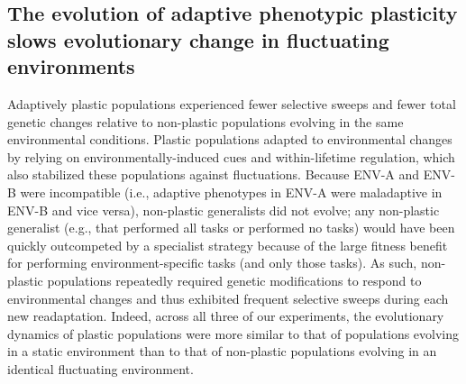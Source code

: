 \subsection{The evolution of adaptive phenotypic plasticity slows evolutionary change in fluctuating environments}

Adaptively plastic populations experienced fewer selective sweeps and fewer total genetic changes relative to non-plastic populations evolving in the same environmental conditions.
Plastic populations adapted to environmental changes by relying on environmentally-induced cues and within-lifetime regulation, which also stabilized these populations against fluctuations. 
Because ENV-A and ENV-B were incompatible (i.e., adaptive phenotypes in ENV-A were maladaptive in ENV-B and vice versa), non-plastic generalists did not evolve; any non-plastic generalist (e.g., that performed all tasks or performed no tasks) would have been quickly outcompeted by a specialist strategy because of the large fitness benefit for performing environment-specific tasks (and only those tasks).
As such, non-plastic populations repeatedly required genetic modifications to respond to environmental changes and thus exhibited frequent selective sweeps during each new readaptation.
Indeed, across all three of our experiments, the evolutionary dynamics of plastic populations were more similar to that of populations evolving in a static environment than to that of non-plastic populations evolving in an identical fluctuating environment.



